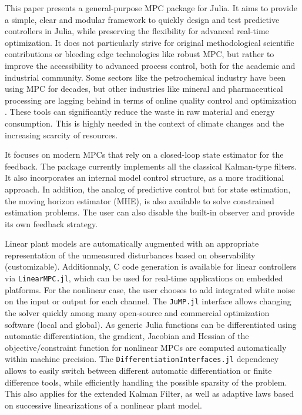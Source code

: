 This paper presents a general-purpose MPC package for Julia. It aims to provide a simple, clear and modular framework to quickly design and test predictive controllers in Julia, while preserving the flexibility for advanced real-time optimization. It does not particularly strive for original methodological scientific contributions or bleeding edge technologies like robust MPC, but rather to improve the accessibility to advanced process control, both for the academic and industrial community. Some sectors like the petrochemical industry have been using MPC for decades, but other industries like mineral and pharmaceutical processing are lagging behind in terms of online quality control and optimization \citep{gapMPC, gapMPC2}. These tools can significantly reduce the waste in raw material and energy consumption. This is highly needed in the context of climate changes and the increasing scarcity of resources.

It focuses on modern MPCs that rely on a closed-loop state estimator for the feedback. The package currently implements all the classical Kalman-type filters. It also incorporates an internal model control structure, as a more traditional approach. In addition, the analog of predictive control but for state estimation, the moving horizon estimator (MHE), is also available to solve constrained estimation problems. The user can also disable the built-in observer and provide its own feedback strategy.

Linear plant models are automatically augmented with an appropriate representation of the unmeasured disturbances based on observability (customizable). Additionnaly, C code generation is available for linear controllers via \texttt{LinearMPC.jl}, which can be used for real-time applications on embedded platforms. For the nonlinear case, the user chooses to add integrated white noise on the input or output for each channel. The \texttt{JuMP.jl} interface allows changing the solver quickly among  many open-source and commercial optimization software (local and global). As generic Julia functions can be differentiated using automatic differentiation, the gradient, Jacobian and Hessian of the objective/constraint function for nonlinear MPCs are computed automatically within machine precision. The \texttt{DifferentiationInterfaces.jl} dependency allows to easily switch between different automatic differentiation or finite difference tools, while efficiently handling the possible sparsity of the problem. This also applies for the extended Kalman Filter, as well as adaptive laws based on successive linearizations of a nonlinear plant model. 

